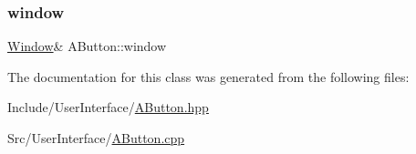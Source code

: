 \mbox{\label{class_a_button_ab8b7ee994bd3b81cfd4ad639733c19df}} 
\subsubsection{\texorpdfstring{window}{window}}
{\footnotesize\ttfamily \mbox{\hyperlink{class_window}{Window}}\& A\+Button\+::window\hspace{0.3cm}{\ttfamily [protected]}}



The documentation for this class was generated from the following files\+:\begin{DoxyCompactItemize}
\item 
Include/\+User\+Interface/\mbox{\hyperlink{_a_button_8hpp}{A\+Button.\+hpp}}\item 
Src/\+User\+Interface/\mbox{\hyperlink{_a_button_8cpp}{A\+Button.\+cpp}}\end{DoxyCompactItemize}
